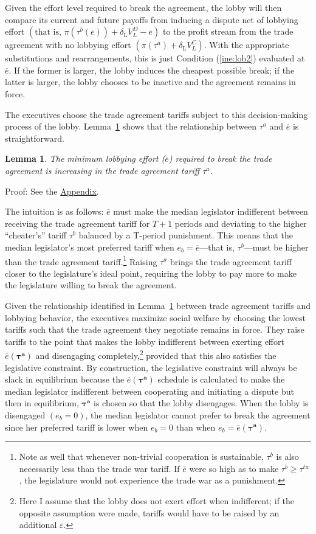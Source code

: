\documentclass[authoryear, review]{elsarticle}
\newtheorem{lemma}{Lemma}
\newcommand{\ov}{\overline}
\newcommand{\bta}{\bm{\tau^a}}
\newcommand{\de}{\delta}
\begin{document}
Given the effort level required to break the agreement, the lobby will then compare its current and future payoffs from inducing a dispute net of lobbying effort $\left(\text{that is, }\pi(\tau^b(\ov{e})) + \de_\text{L} V^D_L - \ov{e}\right)$ to the profit stream from the trade agreement with no lobbying effort $\left(\pi(\tau^a) + \de_\text{L} V^C_L\right)$. With the appropriate substitutions and rearrangements, this is just Condition (\ref{ine:lob2}) evaluated at $\ov{e}$. If the former is larger, the lobby induces the cheapest possible break; if the latter is larger, the lobby chooses to be inactive and the agreement remains in force.

The executives choose the trade agreement tariffs subject to this decision-making process of the lobby. Lemma~\ref{cor:et} shows that the relationship between $\tau^a$ and $\ov{e}$ is straightforward. 
\begin{lemma}
  The minimum lobbying effort ($\ov{e}$) required to break the trade agreement is increasing in the trade agreement tariff $\tau^a$.
  \label{cor:et}
\end{lemma}

Proof: See the \hyperlink{Cor_et}{Appendix}.

\noindent The intuition is as follows: $\ov{e}$ must make the median legislator indifferent between receiving the trade agreement tariff for $T+1$ periods and deviating to the higher ``cheater's'' tariff $\tau^b$ balanced by a T-period punishment. This means that the median legislator's most preferred tariff when $e_b=\ov{e}$---that is, $\tau^b$---must be higher than the trade agreement tariff.\footnote{Note as well that whenever non-trivial cooperation is sustainable, $\tau^b$ is also necessarily less than the trade war tariff. If $\ov{e}$ were so high as to make $\tau^b \geq \tau^{tw}$, the legislature would not experience the trade war as a punishment.} Raising $\tau^a$ brings the trade agreement tariff closer to the legislature's ideal point, requiring the lobby to pay more to make the legislature willing to break the agreement.

Given the relationship identified in Lemma~\ref{cor:et} between trade agreement tariffs and lobbying behavior, the executives maximize social welfare by choosing the lowest tariffs such that the trade agreement they negotiate remains in force. They raise tariffs to the point that makes the lobby indifferent between exerting effort $\ov{e}(\bta)$ and disengaging completely,\footnote{Here I assume that the lobby does not exert effort when indifferent; if the opposite assumption were made, tariffs would have to be raised by an additional $\varepsilon$.} provided that this also satisfies the legislative constraint. By construction, the legislative constraint will always be slack in equilibrium because the $\ov{e}(\bta)$ schedule is calculated to make the median legislator indifferent between cooperating and initiating a dispute but then in equilibrium, $\bta$ is chosen so that the lobby disengages. When the lobby is disengaged $\left(e_b=0\right)$, the median legislator cannot prefer to break the agreement since her preferred tariff is lower when $e_b=0$ than when $e_b=\ov{e}(\bta)$.
\end{document}
